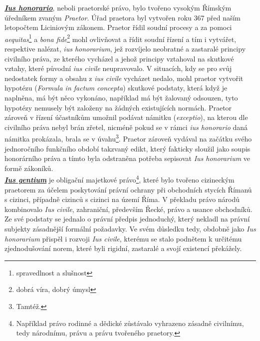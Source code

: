 \documentclass{article}
\begin{document}


\underline{\textbf{\textit{Ius honorario}}}, neboli praetorské právo, bylo tvořeno vysokým Římským úředníkem zvaným \textit{Praetor}. Úřad praetora byl vytvořen roku 367 před naším letopočtem Liciniovým zákonem. Praetor řídil soudní procesy a za pomoci \textit{aequitas}\footnote{spravedlnost a slušnost} a \textit{bona fide}\footnote{dobrá víra, dobrý úmysl} mohl ovlivňovat a řídit soudní řízení a tím i vytvářet, respektive nalézat, \textit{ius honorarium}, jež rozvíjelo neobratné a zastaralé principy civilního práva, ze kterého vycházel a jehož principy vztahoval na skutkové vztahy, které původní \textit{ius civile} neupravovalo. V situacích, kdy se pro svůj nedostatek formy a obsahu z \textit{ius civile} vycházet nedalo, mohl praetor vytvořit hypotézu (\textit{Formula in factum concepta}) skutkové podstaty, která když je naplněna, má být něco vykonáno, například má být žalovaný odsouzen, tyto hypotézy nemusely být založeny na žádných existujících normách. Praetor zároveň v řízení účastníkům umožnil podávat námitku (\textit{exceptio}), na kterou dle civilního práva nebyl brán zřetel, nicméně pokud se v rámci \textit{ius honorario} daná námitka prokázala, brala se v úvahu\footnote{Tamtéž.}. Praetor zároveň vydával na začátku svého jednoročního funkčního období takzvaný edikt, který fakticky sloužil jako soupis honorárního práva a tímto byla odstraněna potřeba sepisovat \textit{Ius honorarium} ve formě zákoníků. \\


\underline{\textbf{\textit{Ius gentium}}} je obligační majetkové právo\footnote{Například právo rodinné a dědické zůstávalo vyhrazeno zásadně civilnímu, tedy národnímu, právu a právu tvořeného praetory.}, které bylo tvořeno cizineckým praetorem za účelem poskytování právní ochrany při obchodních stycích Římanů s cizinci, případně cizinců s cizinci na území Říma. V překladu právo národů kombinovalo \textit{Ius civile}, zahraniční, především Řecké, právo a usance obchodníků. Ze své podstaty se jednalo o právní předpis jednoduchý, který nekladl na právní subjekty zásadnější formální požadavky. Ve svém důsledku tedy, obdobně jako \textit{Ius honorarium} přispěl i rozvoji \textit{Ius civile}, kterému se stalo podnětem k určitému zjednodušování norem, které byli rigidní, zastaralé a svojí existencí překážely.\\
\end{document}
